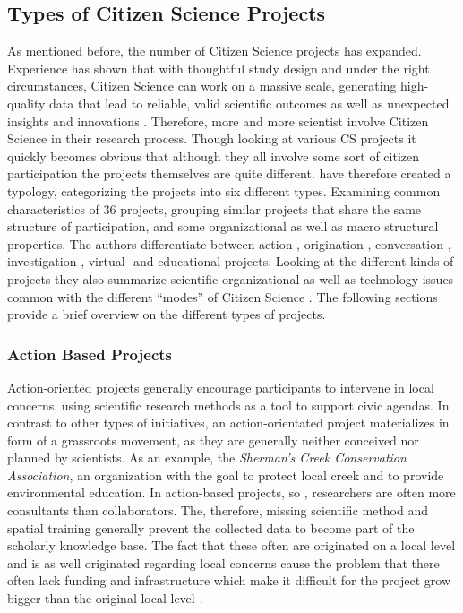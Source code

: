 \subsection{Types of Citizen Science Projects}
\label{ssec:Types_CS}
As mentioned before, the number of Citizen Science projects has expanded. Experience has shown that with thoughtful study design and under the right circumstances, Citizen Science can work on a massive scale, generating high-quality data that lead to reliable, valid scientific outcomes as well as unexpected insights and innovations  \parencite{Hakalay2014}. Therefore, more and more scientist involve Citizen Science in their research process. Though looking at various CS projects it quickly becomes  obvious that although they all involve some sort of citizen participation the projects themselves are quite different. \citeauthor{WigginsCrowston2011} have therefore created a typology, categorizing the projects into six different types. Examining common characteristics of 36 projects, grouping similar projects that share the same structure of participation, and some organizational as well as macro structural properties. The authors differentiate between action-, origination-, conversation-, investigation-, virtual- and educational projects. Looking at the different kinds of projects they also summarize scientific organizational as well as technology issues common with the different “modes” of Citizen Science \parencite{WigginsCrowston2011}. The following sections provide a brief overview on the different types of projects. 

\subsubsection{Action Based Projects}
Action-oriented projects generally encourage participants to intervene in local concerns, using scientific research methods as a tool to support civic agendas. In contrast to other types of initiatives, an action-orientated project materializes in form of a grassroots movement, as they are generally neither conceived nor planned by scientists. As an example, the \textit{Sherman’s Creek Conservation Association}, an organization with the goal to protect local creek and to provide environmental education. In action-based projects, so \citeauthor{WigginsCrowston2011}, researchers are often more consultants than collaborators. The, therefore, missing scientific method and spatial training generally prevent the collected data to become part of the scholarly knowledge base. The fact that these often are originated on a local level and is as well originated regarding local concerns cause the problem that there often lack funding and infrastructure which make it difficult for the project grow bigger than the original local level \parencite{WigginsCrowston2011}.

